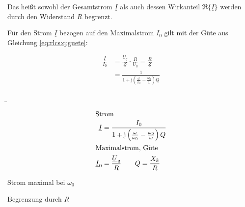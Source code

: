 \begin{frame}
{    Das heißt sowohl der Gesamtstrom $\underline{I}$ als auch dessen Wirkanteil $\Re\{\underline{I}\}$ werden durch den Widerstand $R$ begrenzt.

    Für den Strom $\underline{I}$ bezogen auf den Maximalstrom $I_0$ gilt mit der Güte aus Gleichung \ref{eq:rlcs:q:guete}:

    \begin{equation}\label{eq:rlcs:inorm}
        \begin{aligned}
            \frac{\underline{I}}{I_0} 
            &= \frac{U_q}{\underline{Z}} \cdot \frac{R}{U_q} 
            =  \frac{R}{\underline{Z}}\\
            &= \frac{1}{1 + \mathrm{j} \left(\frac{\omega}{\omega_0} - \frac{\omega_0}{\omega}\right) Q}
        \end{aligned}
    \end{equation}
}
\b{%
    \begin{minipage}{0.3\textwidth}%
    \begin{align*}
        \intertext{Strom}
        \underline{I} &= \frac{I_0}{1 + \mathrm{j}\left(\frac{\omega}{\omega_0} - \frac{\omega_0}{\omega}\right)Q}\\
        \intertext{Maximalstrom, Güte}
        \underline{I}_0 &= \frac{\underline{U}_q}{R}
        \qquad Q = \frac{X_k}{R}        
    \end{align*}
    \end{minipage}\hfill%
    \begin{minipage}{0.65\textwidth}\centering
        \par Strom maximal bei $\omega_0$

        Begrenzung durch $R$
    \end{minipage}
}
\end{frame}

